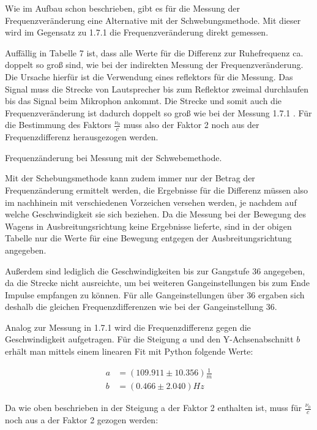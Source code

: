 Wie im Aufbau schon beschrieben, gibt es für die Messung der Frequenzveränderung eine Alternative
mit der Schwebungsmethode. Mit dieser wird im Gegensatz zu 1.7.1 die Frequenzveränderung direkt gemessen.

Auffällig in Tabelle 7 ist, dass alle Werte für die Differenz zur Ruhefrequenz ca. doppelt so groß sind,
wie bei der indirekten Messung der Frequenzveränderung. Die Ursache hierfür ist die Verwendung eines
reflektors für die Messung. Das Signal muss die Strecke von Lautsprecher bis zum Reflektor zweimal durchlaufen
bis das Signal beim Mikrophon ankommt. Die Strecke und somit auch die Frequenzveränderung ist
dadurch doppelt so groß wie bei der Messung 1.7.1 . Für die Bestimmung des Faktors $\frac{\nu_0}{c}$ muss
also der Faktor 2 noch aus der Frequenzdifferenz herausgezogen werden.

\begin{table}
  \centering
  \caption{Frequenzänderung bei Messung mit der Schwebemethode.}
\end{table}

Mit der Schebungsmethode kann zudem immer nur der Betrag der Frequenzänderung ermittelt werden,
die Ergebnisse für die Differenz müssen also im nachhinein mit verschiedenen Vorzeichen versehen werden,
je nachdem auf welche Geschwindigkeit sie sich beziehen. Da die Messung bei der Bewegung des Wagens
in Ausbreitungsrichtung keine Ergebnisse lieferte, sind in der obigen Tabelle nur die Werte für eine
Bewegung entgegen der Ausbreitungsrichtung angegeben.

Außerdem sind lediglich die Geschwindigkeiten bis zur Gangstufe 36 angegeben, da die
Strecke nicht ausreichte, um bei weiteren Gangeinstellungen bis zum Ende Impulse empfangen zu können.
Für alle Gangeinstellungen über 36 ergaben sich deshalb die gleichen Frequenzdifferenzen wie bei
der Gangeinstellung 36.

Analog zur Messung in 1.7.1 wird die Frequenzdifferenz gegen die Geschwindigkeit aufgetragen. Für die
Steigung $a$ und den Y-Achsenabschnitt $b$ erhält man mittels einem linearen Fit mit Python
folgende Werte:

\begin{align}
  a &= (109.911 \pm 10.356) \frac{1}{m} \\
  b &= (0.466 \pm 2.040) Hz
\end{align}

Da wie oben beschrieben in der Steigung a der Faktor 2 enthalten ist, muss für $\frac{\nu_0}{c}$
noch aus a der Faktor 2 gezogen werden:

